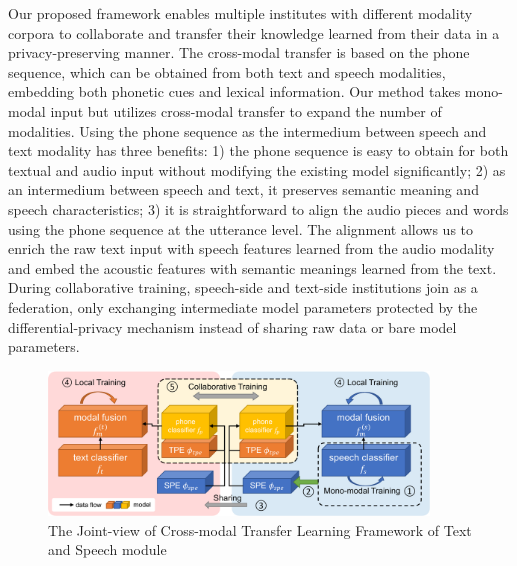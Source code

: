 \documentclass[11pt]{article}
\begin{document}
Our proposed framework enables multiple institutes with different modality corpora to collaborate and transfer their knowledge learned from their data in a privacy-preserving manner. The cross-modal transfer is based on the phone sequence, which can be obtained from both text and speech modalities, embedding both phonetic cues and lexical information. Our method takes mono-modal input but utilizes cross-modal transfer to expand the number of modalities. Using the phone sequence as the intermedium between speech and text modality has three benefits: 1) the phone sequence is easy to obtain for both textual and audio input without modifying the existing model significantly; 2) as an intermedium between speech and text, it preserves semantic meaning and speech characteristics; 3) it is straightforward to align the audio pieces and words using the phone sequence at the utterance level. The alignment allows us to enrich the raw text input with speech features learned from the audio modality and embed the acoustic features with semantic meanings learned from the text. During collaborative training, speech-side and text-side institutions join as a federation, only exchanging intermediate model parameters protected by the differential-privacy mechanism instead of sharing raw data or bare model parameters.

\begin{figure}[!htp]
    \centering
    \includegraphics[width=0.9\textwidth, trim={5 5 5 5},clip]{submissions/XueyangWu/framework.pdf}
    \caption{The Joint-view of Cross-modal Transfer Learning Framework of Text and Speech module}
    \label{fig:fct}
    \medskip %

\end{figure}
\end{document}

